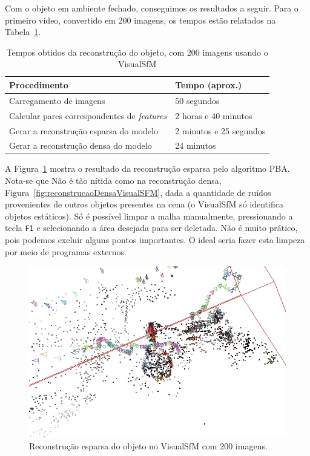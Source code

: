 Com o objeto em ambiente fechado, conseguimos os resultados a seguir. 
Para o primeiro vídeo, convertido em 200 imagens, os tempos estão relatados na
Tabela~\ref{tab:temposSfM}.
\begin{table}
\caption{Tempos obtidos da reconstrução do objeto, com 200 imagens usando o VisualSfM}
\label{tab:temposSfM}
\begin{tabular}{|l|p{4.7cm}|}
\hline
Procedimento & Tempo (aprox.) \\ \hline
Carregamento de imagens & 50 segundos \\ \hline
Calcular pares correspondentes de \emph{features} & 2 horas e 40 minutos \\ \hline
Gerar a reconstrução esparsa do modelo & 2 minutos e 25 segundos \\ \hline
Gerar a reconstrução densa do modelo & 24 minutos \\ \hline
\end{tabular}
\end{table}

A Figura~\ref{fig:reconstrucaoEsparsaVisualSFM} mostra o resultado da
reconstrução esparsa pelo algoritmo PBA. Nota-se que Não é tão nítida como na reconstrução
densa, Figura~\ref{fig:reconstrucaoDensaVisualSFM}, dada a quantidade de ruídos
provenientes de outros objetos presentes na cena (o VisualSfM só identifica
objetos estáticos). Só é possível limpar a malha manualmente, pressionando a
tecla \texttt{F1} e selecionando a área desejada para ser deletada. Não é muito prático,
pois podemos excluir alguns pontos importantes. O ideal seria fazer esta limpeza
por meio de programas externos.

\begin{figure}[!h]
	\centering
	\includegraphics[width=0.5\linewidth]{figs/galinhasparsa.jpg}
	\caption{%
	Reconstrução esparsa do objeto no VisualSfM com 200 imagens.
	}\label{fig:reconstrucaoEsparsaVisualSFM}
\end{figure}

